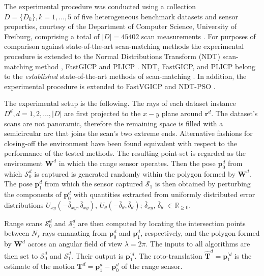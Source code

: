 The experimental procedure was conducted using a collection $D = \{D_k\}, k =
1,\dots,5$ of five heterogeneous benchmark datasets and sensor properties,
courtesy of the Department of Computer Science, University of Freiburg,
comprising a total of $|D| = 45402$ scan measurements \cite{datasets_link}.
For purposes of comparison against state-of-the-art scan-matching methods the
experimental procedure is extended to the Normal Distributions Transform (NDT)
scan-matching method \cite{Biber}, FastGICP \cite{Segal2009} and PLICP
\cite{Censi2008b}.  NDT, FastGICP, and PLICP belong to the \textit{established}
state-of-the-art methods of scan-matching
\cite{Koide2021,Xu2018a,Sobreira2019a,Pishehvari2019a,Qingshan2019a,Pham2021a}.
In addition, the experimental procedure is extended to FastVGICP
\cite{Pham2021a} and NDT-PSO \cite{Bouraine2020}.

The experimental setup is the following. The rays of each dataset instance
$D^d, d = 1,2,\dots,|D|$ are first projected to the $x-y$ plane around
$\bm{r}^d$.  The dataset's scans are not panoramic, therefore the remaining
space is filled with a semicircular arc that joins the scan's two extreme ends.
Alternative fashions for closing-off the environment have been found equivalent
with respect to the performance of the tested methods. The resulting point-set
is regarded as the environment $\bm{W}^d$ in which the range sensor operates.
Then the pose $\bm{p}_0^d$ from which $\mathcal{S}_0^d$ is captured is
generated randomly within the polygon formed by $\bm{W}^d$. The pose
$\bm{p}_1^d$ from which the sensor captured $\mathcal{S}_1$ is then obtained by
perturbing the components of $\bm{p}_0^d$ with quantities extracted from
uniformly distributed error distributions $U_{xy}(-\overline{\delta}_{xy},
\overline{\delta}_{xy})$, $U_{\theta}(-\overline{\delta}_{\theta},
\overline{\delta}_{\theta})$; $\overline{\delta}_{xy}$,
$\overline{\delta}_\theta$ $\in \mathbb{R}_{\geq 0}$.

Range scans $\mathcal{S}_0^d$ and $\mathcal{S}_1^d$ are then computed by
locating the intersection points between $N_s$ rays emanating from $\bm{p}_0^d$
and $\bm{p}_1^d$, respectively, and the polygon formed by $\bm{W}^d$ across an
angular field of view $\lambda = 2\pi$. The inputs to all algorithms are
then set to $\mathcal{S}_0^d$ and $\mathcal{S}_1^d$. Their output is
$\bm{p}_1^{\prime d}$. The roto-translation
$\hat{\bm{T}}^d = \bm{p}_1^{\prime d}$ is the estimate of the motion
$\bm{T}^d = \bm{p}_1^d - \bm{p}_0^d$ of the range sensor.

